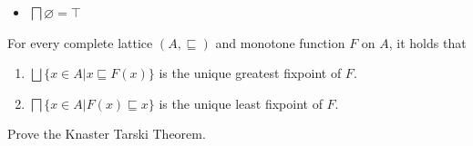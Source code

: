 {{\begin{example}
\begin{itemize}
        \item $\bigsqcap \varnothing = \top$
    \end{itemize}
\end{example}
\begin{theorem}
    For every complete lattice $(A,\sqsubseteq)$ and monotone function $F$ on $A$, it holds that
    \begin{enumerate}
        \item $\bigsqcup \{x\in A| x \sqsubseteq F(x)\}$ is the unique greatest fixpoint of $F$. 
        \item $\bigsqcap \{x \in A| F(x) \sqsubseteq x\}$ is the unique least fixpoint of $F$. 
    \end{enumerate}
\end{theorem}


\begin{homework}
    Prove the Knaster Tarski Theorem.
\end{homework}

}} %
